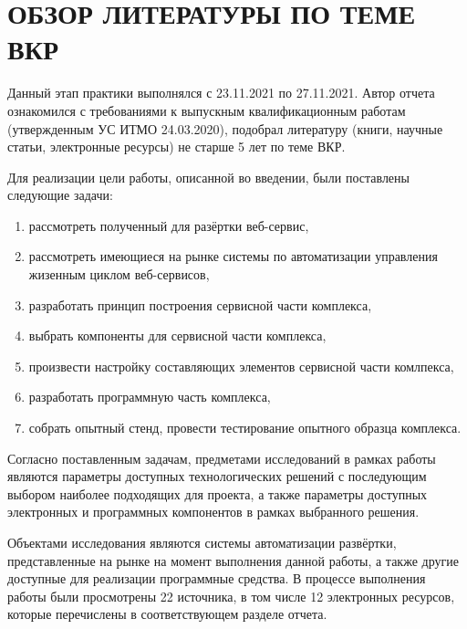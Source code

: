 \section{ОБЗОР ЛИТЕРАТУРЫ ПО ТЕМЕ ВКР}

Данный этап практики выполнялся с 23.11.2021 по 27.11.2021.
Автор отчета ознакомился с требованиями к выпускным квалификационным работам (утвержденным УС ИТМО 24.03.2020), подобрал литературу (книги, научные статьи, электронные ресурсы) не старше 5 лет по теме ВКР.

Для реализации цели работы, описанной во введении, были поставлены следующие задачи:
\begin{enumerate}
    \item рассмотреть полученный для разёртки веб-сервис,
    \item рассмотреть имеющиеся на рынке системы по автоматизации управления жизенным циклом веб-сервисов,
    \item разработать принцип построения сервисной части комплекса,
    \item выбрать компоненты для сервисной части комплекса,
    \item произвести настройку составляющих элементов сервисной части комлпекса,
    \item разработать программную часть комплекса,
    \item собрать опытный стенд, провести тестирование опытного образца комплекса.
\end{enumerate}

Согласно поставленным задачам, предметами исследований в рамках работы являются параметры доступных технологических
решений с последующим выбором наиболее подходящих для проекта, а также параметры доступных электронных и программных
компонентов в рамках выбранного решения.

Объектами исследования являются системы автоматизации развёртки, представленные на рынке на момент выполнения данной работы, а также другие доступные для реализации программные средства.
В процессе выполнения работы были просмотрены 22 источника, в том числе 12 электронных ресурсов, которые перечислены в соответствующем разделе отчета.
